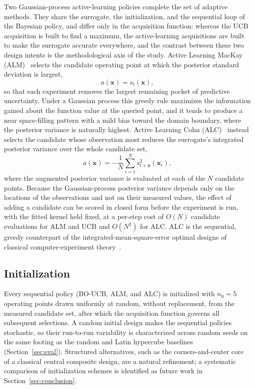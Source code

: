\documentclass[preprint,12pt]{elsarticle}
\begin{document}
Two Gaussian-process active-learning policies complete the set of adaptive methods.
They share the surrogate, the initialization, and the sequential loop of the Bayesian
policy, and differ only in the acquisition function: whereas the UCB acquisition is
built to find a maximum, the active-learning acquisitions are built to make the
surrogate accurate everywhere, and the contrast between these two design intents is
the methodological axis of the study. Active Learning MacKay (ALM)~\cite{mackay1992alm}
selects the candidate operating point at which the posterior standard deviation is
largest,
\begin{equation}
a(\mathbf{x}) = s_t(\mathbf{x}),
\label{eq:alm}
\end{equation}
so that each experiment removes the largest remaining pocket of predictive
uncertainty. Under a Gaussian process this greedy rule maximizes the information
gained about the function value at the queried point, and it tends to produce a near
space-filling pattern with a mild bias toward the domain boundary, where the posterior
variance is naturally highest. Active Learning Cohn (ALC)~\cite{cohn1996alc} instead
selects the candidate whose observation most reduces the surrogate's integrated
posterior variance over the whole candidate set,
\begin{equation}
a(\mathbf{x}) = -\frac{1}{N}\sum_{i=1}^{N} s^2_{t+\mathbf{x}}(\mathbf{x}_i),
\label{eq:alc}
\end{equation}
where the augmented posterior variance is evaluated at each of the $N$ candidate
points. Because the Gaussian-process posterior variance depends only on the locations
of the observations and not on their measured values, the effect of adding a candidate
can be scored in closed form before the experiment is run, with the fitted kernel held
fixed, at a per-step cost of $O(N)$ candidate evaluations for ALM and UCB and $O(N^2)$
for ALC. ALC is the sequential, greedy counterpart of the integrated-mean-square-error
optimal designs of classical computer-experiment theory~\cite{sacks1989doe}.

\subsection{Initialization}
Every sequential policy (BO-UCB, ALM, and ALC) is initialized with $n_0 = 5$ operating
points drawn uniformly at random, without replacement, from the measured candidate
set, after which the acquisition function governs all subsequent selections. A random
initial design makes the sequential policies stochastic, so their run-to-run
variability is characterized across random seeds on the same footing as the random and
Latin hypercube baselines (Section~\ref{sec:eval}). Structured alternatives, such as
the corners-and-center core of a classical central composite design, are a natural
refinement; a systematic comparison of initialization schemes is identified as future
work in Section~\ref{sec:conclusion}.
\end{document}

